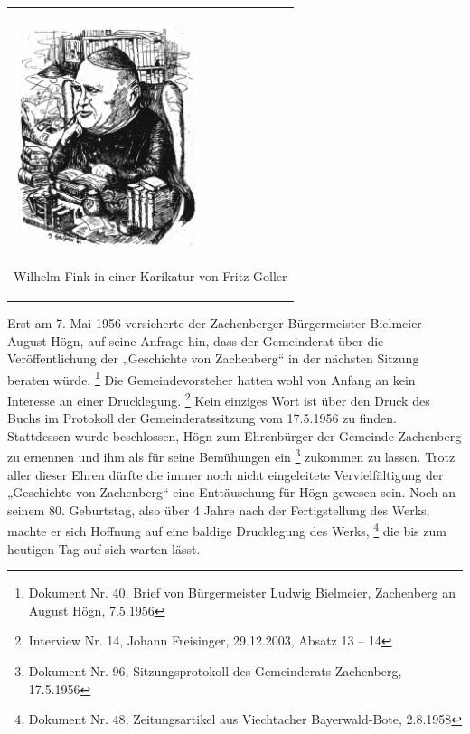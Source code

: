\begin{center}
\begin{minipage}{5.812cm}
\begin{center}
\tablefirsthead{}
\tablehead{}
\tabletail{}
\tablelasttail{}
\begin{supertabular}{m{5.612cm}}

\includegraphics[width=5.429cm,height=6.68cm]{pictures/zulassungsarbeit-img044.png}

Wilhelm Fink in einer Karikatur von
Fritz Goller\\
\end{supertabular}
\end{center}
\end{minipage}
\end{center}
Erst am 7. Mai 1956 versicherte der Zachenberger Bürgermeister Bielmeier
August Högn, auf seine Anfrage hin, dass der Gemeinderat über die
Veröffentlichung der „Geschichte von Zachenberg“ in der nächsten
Sitzung beraten würde. \footnote{Dokument Nr. 40, Brief von
Bürgermeister Ludwig Bielmeier, Zachenberg an August Högn, 7.5.1956}
Die Gemeindevorsteher hatten wohl von Anfang an kein Interesse an einer
Drucklegung. \footnote{Interview Nr. 14, Johann Freisinger, 29.12.2003,
Absatz 13 – 14} Kein einziges Wort ist über den Druck des Buchs im
Protokoll der Gemeinderatssitzung vom 17.5.1956 zu finden. Stattdessen
wurde beschlossen, Högn zum Ehrenbürger der Gemeinde Zachenberg zu
ernennen und ihm als für seine
Bemühungen ein  \footnote{Dokument Nr. 96,
Sitzungsprotokoll des Gemeinderats Zachenberg, 17.5.1956} zukommen zu
lassen. Trotz aller dieser Ehren dürfte die immer noch nicht
eingeleitete Vervielfältigung der „Geschichte von Zachenberg“ eine
Enttäuschung für Högn gewesen sein. Noch an seinem 80. Geburtstag, also
über 4 Jahre nach der Fertigstellung des Werks, machte er sich Hoffnung
auf eine baldige Drucklegung des Werks, \footnote{Dokument Nr. 48,
Zeitungsartikel aus Viechtacher Bayerwald-Bote, 2.8.1958} die bis zum
heutigen Tag auf sich warten lässt.

